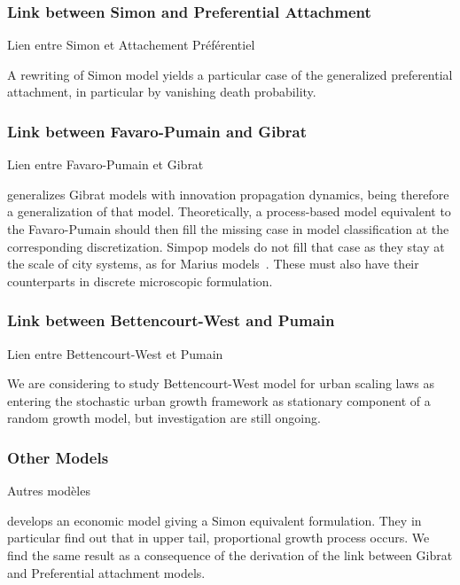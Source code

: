 \subsubsection{Link between Simon and Preferential Attachment}{Lien entre Simon et Attachement Préférentiel}

A rewriting of Simon model yields a particular case of the generalized preferential attachment, in particular by vanishing death probability.

\subsubsection{Link between Favaro-Pumain and Gibrat}{Lien entre Favaro-Pumain et Gibrat}

\cite{favaro2011gibrat} generalizes Gibrat models with innovation propagation dynamics, being therefore a generalization of that model. Theoretically, a process-based model equivalent to the Favaro-Pumain should then fill the missing case in model classification at the corresponding discretization. Simpop models do not fill that case as they stay at the scale of city systems, as for Marius models~\cite{cottineau2014evolution}. These must also have their counterparts in discrete microscopic formulation.


\subsubsection{Link between Bettencourt-West and Pumain}{Lien entre Bettencourt-West et Pumain}

We are considering to study Bettencourt-West model for urban scaling laws \cite{bettencourt2008large} as entering the stochastic urban growth framework as stationary component of a random growth model, but investigation are still ongoing.


\subsubsection{Other Models}{Autres modèles}

\cite{gabaix1999zipf} develops an economic model giving a Simon equivalent formulation. They in particular find out that in upper tail, proportional growth process occurs. We find the same result as a consequence of the derivation of the link between Gibrat and Preferential attachment models.



